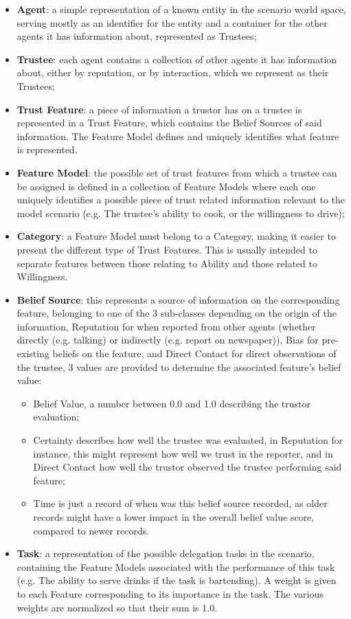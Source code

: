 \begin{itemize}
    \item \textbf{Agent}: a simple representation of a known entity in the scenario world space, serving mostly as an identifier for the entity and a container for the other agents it has information about, represented as Trustees;
    \item \textbf{Trustee}: each agent contains a collection of other agents it has information about, either by reputation, or by interaction, which we represent as their Trustees;
    \item \textbf{Trust Feature}: a piece of information a trustor has on a trustee is represented in a Trust Feature, which contains the Belief Sources of said information. The Feature Model defines and uniquely identifies what feature is represented.
    \item \textbf{Feature Model}: the possible set of trust features from which a trustee can be assigned is defined in a collection of Feature Models where each one uniquely identifies a possible piece of trust related information relevant to the model scenario (e.g. The trustee's ability to cook, or the willingness to drive);
    \item \textbf{Category}: a Feature Model must belong to a Category, making it easier to  present the different type of Trust Features. This is usually intended to separate features between those relating to Ability and those related to Willingness.
    \item \textbf{Belief Source}: this represents a source of information on the corresponding feature, belonging to one of the 3 sub-classes depending on the origin of the information, Reputation for when reported from other agents (whether directly (e.g. talking) or indirectly (e.g. report on newspaper)), Bias for pre-existing beliefs on the feature, and Direct Contact for direct observations of the trustee, 3 values are provided to determine the associated feature's belief value: 
    \begin{itemize}
        \item Belief Value, a number between 0.0 and 1.0 describing the trustor evaluation;
        \item Certainty describes how well the trustee was evaluated, in Reputation for instance, this might represent how well we trust in the reporter, and in Direct Contact how well the trustor observed the trustee performing said feature;
        \item Time is just a record of when was this belief source recorded, as older records might have a lower impact in the overall belief value score, compared to newer records.
    \end{itemize} 
    \item \textbf{Task}: a representation of the possible delegation tasks in the scenario, containing the Feature Models associated with the performance of this task (e.g. The ability to serve drinks if the task is bartending). A weight is given to each Feature corresponding to its importance in the task. The various weights are normalized so that their sum is 1.0.
\end{itemize} 

